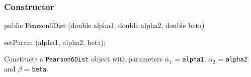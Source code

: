 \subsubsection* {Constructor}

\begin{code}

   public Pearson6Dist (double alpha1, double alpha2, double beta)\begin{hide} {
      setParam (alpha1, alpha2, beta);
   }\end{hide}
\end{code}
\begin{tabb}
   Constructs a \texttt{Pearson6Dist} object with parameters $\alpha_1$ =
   \texttt{alpha1}, $\alpha_2$ = \texttt{alpha2} and $\beta$ = \texttt{beta}.
\end{tabb}


